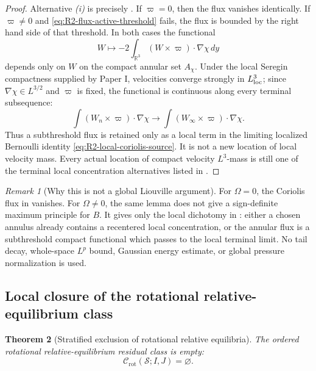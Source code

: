 \documentclass[11pt]{amsart}
\numberwithin{equation}{section}
\theoremstyle{plain}
\newtheorem{theorem}{Theorem}[section]
\theoremstyle{definition}
\theoremstyle{remark}
\newtheorem{remark}[theorem]{Remark}
\newcommand{\Crot}{\mathcal C_{\mathrm{rot}}}
\begin{document}
\begin{proof}
Alternative \emph{(i)} is precisely
.  If \(\varpi=0\), then the flux
vanishes identically.  If \(\varpi\ne0\) and
\eqref{eq:R2-flux-active-threshold} fails, the flux is bounded by the right hand
side of that threshold.  In both cases the functional
\[
   W\longmapsto -2\int_{\mathbb R^3}(W\times\varpi)\cdot\nabla\chi\,dy
\]
depends only on \(W\) on the compact annular set \(A_\chi\).  Under the local
Seregin compactness supplied by Paper I, velocities converge strongly in
\(L^3_{\rm loc}\); since \(\nabla\chi\in L^{3/2}\) and \(\varpi\) is fixed, the
functional is continuous along every terminal subsequence:
\[
   \int (W_n\times\varpi)\cdot\nabla\chi
   \longrightarrow
   \int (W_\infty\times\varpi)\cdot\nabla\chi .
\]
Thus a subthreshold flux is retained only as a local term in the limiting
localized Bernoulli identity \eqref{eq:R2-local-coriolis-source}.  It is not a
new location of local velocity mass.  Every actual location of compact velocity
\(L^3\)-mass is still one of the terminal local concentration alternatives listed in
.
\end{proof}

\begin{remark}[Why this is not a global Liouville argument]
\label{rem:R2-no-global-liouville}
For \(\Omega=0\), the Coriolis flux in
 vanishes.  For \(\Omega\ne0\), the
same lemma does not give a sign-definite maximum principle for \(B\).  It gives
only the local dichotomy in : either a
chosen annulus already contains a recentered local concentration, or the
annular flux is a subthreshold compact functional which passes to the local
terminal limit.  No tail decay, whole-space \(L^p\) bound, Gaussian energy
estimate, or global pressure normalization is used.
\end{remark}

\subsection{Local closure of the rotational relative-equilibrium class}

\begin{theorem}[Stratified exclusion of rotational relative equilibria]
\label{thm:R2-exclusion-safe}
The ordered rotational relative-equilibrium residual class is empty:
\begin{equation}\label{eq:R2-empty-safe}
   \Crot(\mathcal S;I,J)=\varnothing .
\end{equation}
\end{theorem}
\end{document}
